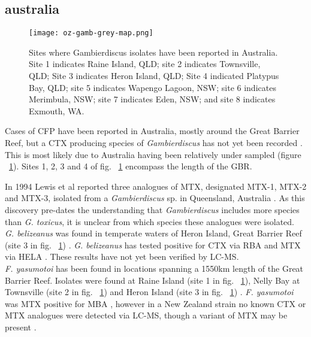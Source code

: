 \documentclass[12pt]{article}
\begin{document}
\subsection{australia}
\FloatBarrier
\begin{figure} 
\texttt{[image: oz-gamb-grey-map.png]} 
\caption{Sites where Gambierdiscus isolates have been reported in Australia. Site 1 indicates Raine Island, QLD; site 2 indicates Townsville, QLD; Site 3 indicates Heron Island, QLD; Site 4 indicated Platypus Bay, QLD; site 5 indicates Wapengo Lagoon, NSW; site 6 indicates Merimbula, NSW; site 7 indicates Eden, NSW; and site 8 indicates Exmouth, WA.​} 
\label{fig:OzSites}
\end{figure}
\FloatBarrier 
Cases of CFP have been reported in Australia, mostly around the Great Barrier Reef, but a CTX producing species of \emph{Gambierdiscus} has not yet been recorded \cite{lewis2006ciguatera}. This is most likely due to Australia having been relatively under sampled (figure ~\ref{fig:OzSites}). Sites 1, 2, 3 and 4 of fig. ~\ref{fig:OzSites} encompass the length of the GBR.

In 1994 Lewis et al reported three analogues of MTX, designated MTX-1, MTX-2 and MTX-3, isolated from a \emph{Gambierdiscus} sp. in Queensland, Australia \cite{holmes1994purification}. As this discovery pre-dates the understanding that \emph{Gambierdiscus} includes more species than \emph{G. toxicus}, it is unclear from which species these analogues were isolated.  \\


\emph{G. belizeanus} was found in temperate waters of Heron Island, Great Barrier Reef (site 3 in fig. ~\ref{fig:OzSites}) \cite{murray2014molecular}. \emph{G. belizeanus} has tested positive for CTX via RBA \cite{chinain2010growth} and MTX via HELA \cite{holland2013differences}. These results have not yet been verified by LC-MS.\\

\emph{F. yasumotoi} has been found in locations spanning a 1550km length of the Great Barrier Reef. Isolates were found at Raine Island (site 1 in fig. ~\ref{fig:OzSites}), Nelly Bay at Townsville (site 2 in fig. ~\ref{fig:OzSites}) and Heron Island (site 3 in fig. ~\ref{fig:OzSites}) \cite{murray2014molecular}. \emph{F. yasumotoi} was MTX positive for MBA \cite{holmes1998gambierdiscus}, however in a New Zealand strain no known CTX or MTX analogues were detected via LC-MS, though a variant of MTX may be present \cite{rhodes2014gambierdiscus}.
\end{document}
